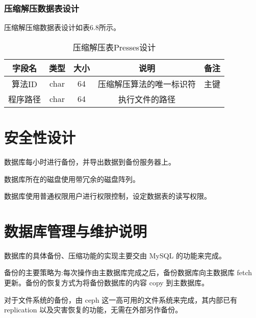 \subsubsection{压缩解压数据表设计}
压缩解压缩数据表设计如表6.8所示。
\begin{table}[htbp]
\centering
\caption{压缩解压表Presses设计} \label{tab:presses-database}
\begin{tabular}{|c|c|c|c|c|}
    \hline
    字段名 & 类型 & 大小 & 说明 & 备注 \\
    \hline
    算法ID & char & 64 & 压缩解压算法的唯一标识符 & 主键\\
    \hline
    程序路径 & char & 64 & 执行文件的路径 & \\
    \hline
\end{tabular}
\end{table}

\section{安全性设计}
数据库每小时进行备份，并导出数据到备份服务器上。

数据库所在的磁盘使用带冗余的磁盘阵列。

数据库使用普通权限用户进行权限控制，设定数据表的读写权限。

\section{数据库管理与维护说明}
数据库的具体备份、压缩功能的实现主要交由 MySQL 的功能来完成。

备份的主要策略为:每次操作由主数据库完成之后，备份数据库向主数据库 fetch 更新。备份的恢复方式为将备份数据库的内容 copy 到主数据库。

对于文件系统的备份，由 ceph 这一高可用的文件系统来完成，其内部已有 replication 以及灾害恢复的功能，无需在外部另作备份。